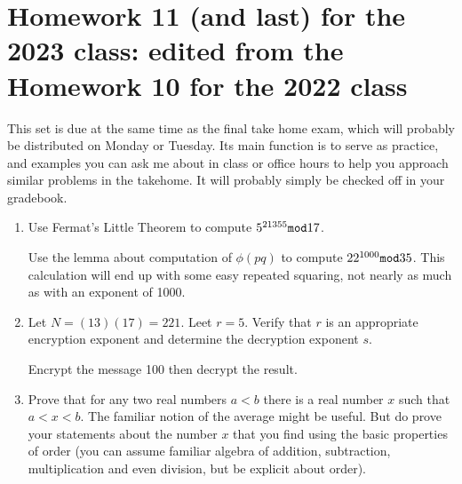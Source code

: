 \documentclass[12pt]{article}
\begin{document}
\newpage

\section{Homework 11 (and last) for the 2023 class:  edited from the Homework 10 for the 2022 class}

This set is due at the same time as the final take home exam, which will probably be distributed on Monday or Tuesday.  Its main function is to serve as practice, and examples you can ask me about in class or office hours to help you approach similar problems in the takehome.  It will probably simply be checked off in your gradebook.

\begin{enumerate}

\item  Use Fermat's Little Theorem to compute $5^{21355} {\tt mod} 17$.

Use the lemma about computation of $\phi(pq)$ to compute $22^{1000} {\tt mod} 35$.  This calculation will end up with some easy repeated squaring, not nearly as much as with an exponent of 1000.

\item  Let $N = (13)(17) = 221$.  Leet $r=5$.   Verify that $r$ is an appropriate encryption exponent
and determine the decryption exponent $s$.

Encrypt the message 100 then decrypt the result.

\item  Prove that for any two real numbers $a<b$ there is a real number $x$ such that $a<x<b$.  The familiar notion of the average might be useful.  But do prove your statements about the number $x$ that you find using the basic properties of order (you can assume familiar algebra of addition, subtraction, multiplication and even division, but be explicit about order).

\begin{comment}

\item  Give a proof that the open interval $(0,1) = \{x \in {\mathbb R}:0<x<1\}$ has no largest element.

Remember that we have proved (and used) the fact that a set of integers which is nonempty and bounded above has a largest element:  this is a result about the reals which is different from what can happen in the integers.

\end{comment}


\end{enumerate}
\end{document}
